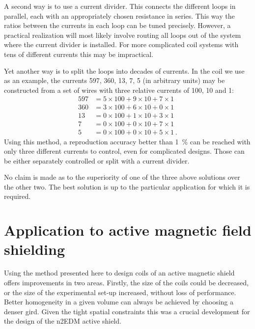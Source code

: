 A second way is to use a current divider.
This connects the different loops in parallel, each with an appropriately chosen resistance in series.
This way the ratios between the currents in each loop can be tuned precisely.
However, a practical realization will most likely involve routing all loops out of the system where the current divider is installed.
For more complicated coil systems with tens of different currents this may be impractical.

Yet another way is to split the loops into decades of currents.
In the coil we use as an example, the currents \num{597}, \num{360}, \num{13}, \num{7}, \num{5} (in arbitrary units) may be constructed from a set of wires with three relative currents of \num{100}, \num{10} and \num{1}:
\begin{align*}
  597 & = 5 \times 100 + 9 \times 10 + 7 \times 1 \\
  360 & = 3 \times 100 + 6 \times 10 + 0 \times 1 \\
  13 & = 0 \times 100 + 1 \times 10 + 3 \times 1 \\
  7 & = 0 \times 100 + 0 \times 10 + 7 \times 1 \\
  5 & = 0 \times 100 + 0 \times 10 + 5 \times 1 \ .
\end{align*}
Using this method, a reproduction accuracy better than \SI{1}{\percent} can be reached with only three different currents to control, even for complicated designs.
Those can be either separately controlled or split with a current divider.

No claim is made as to the superiority of one of the three above solutions over the other two.
The best solution is up to the particular application for which it is required.




\section{Application to active magnetic field shielding}
Using the method presented here to design coils of an active magnetic shield  offers improvements in two areas.
Firstly, the size of the coils could be decreased, or the size of the experimental set-up increased, without loss of performance.
Better homogeneity in a given volume can always be achieved by choosing a denser gird.
Given the tight spatial constraints this was a crucial development for the design of the n2EDM active shield.

